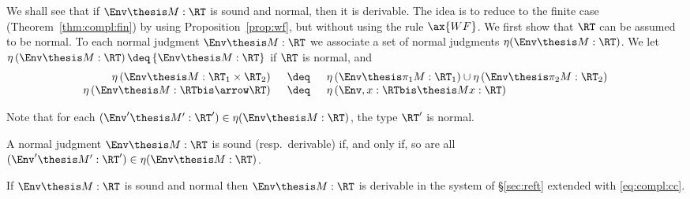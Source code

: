We shall see that if $\Env \thesis M : \RT$ is sound and normal,
then it is derivable.
The idea is to reduce to the finite case (Theorem~\ref{thm:compl:fin})
by using Proposition~\ref{prop:wf},
but without using the rule $\ax{WF}$.
We first show that $\RT$ can be assumed to be normal.
To each normal judgment $\Env \thesis M : \RT$
we associate a set of normal judgments $\eta(\Env \thesis M : \RT)$.
We let
\(
  \eta\left(\Env \thesis M : \RT \right)
  \deq
  \left\{\Env \thesis M : \RT \right\}
\)
if $\RT$ is normal, and
\[
\begin{array}{r !{\quad\deq\quad} l}

  \eta\left(\Env \thesis M : \RT_1 \times \RT_2 \right)
& \eta\left(\Env \thesis \pi_1 M : \RT_1 \right)
  \cup
  \eta\left(\Env \thesis \pi_2 M : \RT_2 \right)
\\

  \eta\left(\Env \thesis M : \RTbis \arrow \RT \right)
& \eta\left( \Env, x: \RTbis \thesis M x : \RT \right)

\end{array}
\]

\noindent
Note that for each $(\Env' \thesis M' : \RT') \in \eta(\Env \thesis M : \RT)$,
the type $\RT'$ is normal.

\begin{proposition}
\label{prop:main:eta}
A normal judgment $\Env \thesis M : \RT$ is sound (resp.\ derivable)
if, and only if, so are all $(\Env' \thesis M' : \RT') \in \eta(\Env \thesis M : \RT)$.
\end{proposition}



\begin{theorem}
\label{thm:main}
If $\Env \thesis M : \RT$ is sound and normal
then $\Env \thesis M : \RT$ is derivable in the system of \S\ref{sec:reft}
extended with \eqref{eq:compl:cc}.
\end{theorem}


